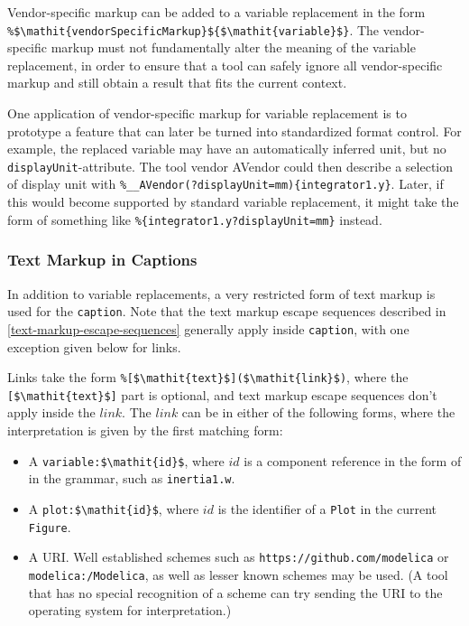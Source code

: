 Vendor-specific markup can be added to a variable replacement in the form \lstinline!%$\mathit{vendorSpecificMarkup}${$\mathit{variable}$}!.
The vendor-specific markup must not fundamentally alter the meaning of the variable replacement, in order to ensure that a tool can safely ignore all vendor-specific markup and still obtain a result that fits the current context.

\begin{example}
One application of vendor-specific markup for variable replacement is to prototype a feature that can later be turned into standardized format control.
For example, the replaced variable may have an automatically inferred unit, but no \lstinline!displayUnit!-attribute.
The tool vendor AVendor could then describe a selection of display unit with \lstinline!%__AVendor(?displayUnit=mm){integrator1.y}!.
Later, if this would become supported by standard variable replacement, it might take the form of something like \lstinline!%{integrator1.y?displayUnit=mm}! instead.
\end{example}

\subsubsection{Text Markup in Captions}\label{text-markup-in-captions}

In addition to variable replacements, a very restricted form of text markup is used for the \lstinline!caption!.
Note that the text markup escape sequences described in \cref{text-markup-escape-sequences} generally apply inside \lstinline!caption!, with one exception given below for links.

Links take the form \lstinline!%[$\mathit{text}$]($\mathit{link}$)!, where the \lstinline![$\mathit{text}$]! part is optional, and text markup escape sequences don't apply inside the $\mathit{link}$.
The $\mathit{link}$ can be in either of the following forms, where the interpretation is given by the first matching form:
\begin{itemize}
\item
A \lstinline!variable:$\mathit{id}$!, where $\mathit{id}$ is a component reference in the form of  in the grammar, such as \lstinline!inertia1.w!.
\item
A \lstinline!plot:$\mathit{id}$!, where $\mathit{id}$ is the identifier of a \lstinline!Plot! in the current \lstinline!Figure!.
\item
A URI.
Well established schemes such as \lstinline[language={[nocomment]modelica}]!https://github.com/modelica! or \lstinline[language={[nocomment]modelica}]!modelica:/Modelica!, as well as lesser known schemes may be used.
(A tool that has no special recognition of a scheme can try sending the URI to the operating system for interpretation.)
\end{itemize}

